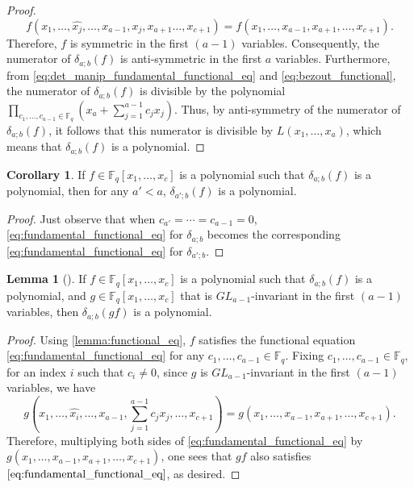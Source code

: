 \documentclass[12pt,a4paper]{report}
\theoremstyle{definition}
\newtheorem{corollary}{Corollary}[theorem]
\newtheorem{lemma}[theorem]{Lemma}
\theoremstyle{remark}
\theoremstyle{definition}
\begin{document}
\begin{proof}
\begin{equation*}
    f(x_1, \ldots, \widehat{x_j}, \ldots, x_{a-1}, x_j, x_{a+1}\ldots, x_{c+1}) =f(x_1,\ldots, x_{a-1}, x_{a+1}, \ldots, x_{c+1}).  
\end{equation*}
Therefore, $f$ is symmetric in the first $(a-1)$ variables. Consequently, the numerator of  $\delta_{a;b}(f)$ is anti-symmetric in the first $a$ variables. Furthermore, from \eqref{eq:det_manip_fundamental_functional_eq} and \eqref{eq:bezout_functional}, the numerator of $\delta_{a;b}(f)$ is divisible by the polynomial $\prod\limits_{c_1, \ldots, c_{a-1}\in \mathbb{F}_q}(x_a + \sum\limits_{j=1}^{a-1}c_j x_j)$. Thus, by anti-symmetry of the numerator of $\delta_{a;b}(f)$, it follows that this numerator is divisible by $L(x_1, \ldots, x_a)$, which means that $\delta_{a;b}(f)$ is a polynomial.
\end{proof}
\begin{corollary}\label{cor:lower_delta_is_easier}
    If $f\in \mathbb{F}_q[x_1, \ldots, x_c]$ is a polynomial such that $\delta_{a;b}(f)$ is a polynomial, then for any $a'<a$, $\delta_{a';b}(f)$ is a polynomial.
\end{corollary}
\begin{proof}
    Just observe that when $c_{a'} = \cdots = c_{a-1} = 0$, \eqref{eq:fundamental_functional_eq} for $\delta_{a;b}$ becomes the corresponding \eqref{eq:fundamental_functional_eq} for $\delta_{a';b}$.
\end{proof}
\begin{lemma}[{\cite[Corollary 3.2]{Ha_Hai_Nghia_2024}}]\label{lemma:polynomiality_D_mod}
    If $f\in \mathbb{F}_q[x_1, \ldots, x_c]$ is a polynomial such that $\delta_{a;b}(f)$ is a polynomial, and $g\in \mathbb{F}_q[x_1, \ldots, x_c]$ that is $GL_{a-1}$-invariant in the first $(a-1)$ variables, then $\delta_{a;b}(gf)$ is a polynomial. 
\end{lemma}
\begin{proof}
    Using \cref{lemma:functional_eq}, $f$ satisfies the functional equation \eqref{eq:fundamental_functional_eq} for any $c_1, \ldots, c_{a-1}\in \mathbb{F}_q$. Fixing $c_1, \ldots, c_{a-1}\in \mathbb{F}_q$, for an index $i$ such that $c_i\neq 0$, since $g$ is $GL_{a-1}$-invariant in the first $(a-1)$ variables, we have
    \begin{equation*}
g(x_1, \ldots, \widehat{x_i},\ldots, x_{a-1}, \sum\limits_{j=1}^{a-1}c_j x_j, \ldots, x_{c+1}) = g(x_1, \ldots, x_{a-1}, x_{a+1}, \ldots, x_{c+1}).        
    \end{equation*}
    Therefore, multiplying both sides of \eqref{eq:fundamental_functional_eq} by $g(x_1, \ldots, x_{a-1}, x_{a+1}, \ldots, x_{c+1})$, one sees that $gf$ also satisfies $\eqref{eq:fundamental_functional_eq}$, as desired.
\end{proof}
\end{document}
